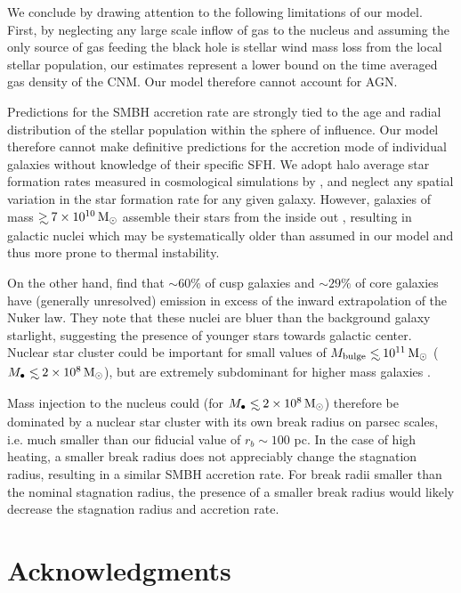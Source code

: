\documentclass[usenatbib,fleqn]{mn2e}
\newcommand\lsim{\mathrel{\rlap{\lower4pt\hbox{\hskip1pt$\sim$}}
    \raise1pt\hbox{$<$}}}
\newcommand\gsim{\mathrel{\rlap{\lower4pt\hbox{\hskip1pt$\sim$}}
    \raise1pt\hbox{$>$}}}
\newcommand{\Mbh}[1][]{M_{\bullet#1}}
\begin{document}
   

We conclude by drawing attention to the following limitations of our
model.  First, by neglecting any large scale inflow of gas to the
nucleus and assuming the only source of gas feeding the black hole is
stellar wind mass loss from the local stellar population, our
estimates represent a lower bound on the time averaged gas density of
the CNM.  Our model therefore cannot account for AGN.

Predictions for the SMBH accretion rate are strongly tied to the age
and radial distribution of the stellar population within the sphere of
influence.  Our model therefore cannot make definitive predictions for
the accretion mode of individual galaxies without knowledge of their
specific SFH.  We adopt halo average star formation rates measured in
cosmological simulations by \citet{MosterNaab+:2013a}, and neglect any
spatial variation in the star formation rate for any given
galaxy. However, galaxies of mass $\gsim 7\times 10^{10} \Msun$
assemble their stars from the inside out
\citep{PerezCidFernandes+:2013a}, resulting in galactic nuclei which
may be systematically older than assumed in our model and thus more
prone to thermal instability.

On the other hand, \citealt{LauerFaber+:2005a} find that $\sim 60\%$
of cusp galaxies and $\sim29\%$ of core galaxies have (generally
unresolved) emission in excess of the inward extrapolation of the
Nuker law.  They note that these nuclei are bluer than the background
galaxy starlight, suggesting the presence of younger stars towards
galactic center. Nuclear star cluster could be important for small
values of $M_{\rm bulge}\lsim 10^{11} \Msun$ ($\Mbh\lsim 2\times 10^8
\Msun$), but are extremely subdominant for higher mass galaxies
\citep{GrahamSpitler:2009a}.

Mass injection to the nucleus could (for $\Mbh\lsim 2 \times 10^{8}
\Msun$) therefore be dominated by a nuclear star cluster with its own
break radius on parsec scales, i.e. much smaller than our fiducial
value of $r_b \sim 100$ pc.  In the case of high heating, a smaller
break radius does not appreciably change the stagnation radius,
resulting in a similar SMBH accretion rate.  For break radii smaller
than the nominal stagnation radius, the presence of a smaller break
radius would likely decrease the stagnation radius and accretion rate.

    

\section*{Acknowledgments}
\end{document}
